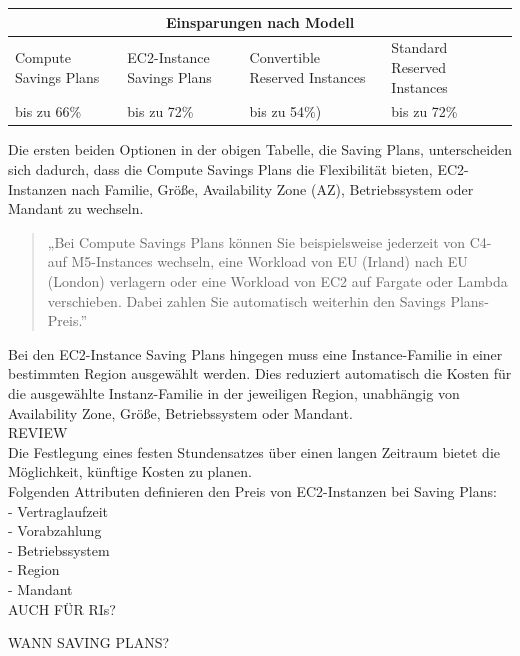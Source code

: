 \begin{table}[h!]
    \centering
    \begin{tabular}{ |p{3cm}||p{3cm}|p{3.6cm}|p{3.6cm}|  }
        \hline
        \multicolumn{4}{|c|}{Einsparungen nach Modell}                                                                    \\
        \hline
        Compute Savings Plans & EC2-Instance Savings Plans & Convertible Reserved Instances & Standard Reserved Instances \\
        \hline
        bis zu 66\%           & bis zu 72\%
                              & bis zu 54\%)               & bis zu 72\%
        \\
        \hline
    \end{tabular}
    {\cite{AMZ07,AMZ11}}
\end{table}
Die ersten beiden Optionen in der obigen Tabelle, die Saving Plans, unterscheiden sich dadurch, dass die Compute Savings Plans die Flexibilität bieten, EC2-Instanzen nach Familie, Größe, Availability Zone (AZ), Betriebssystem oder Mandant zu wechseln.
\begin{quote}
    „Bei Compute Savings Plans können Sie beispielsweise jederzeit von C4- auf M5-Instances wechseln, eine Workload von EU (Irland) nach EU (London) verlagern oder eine Workload von EC2 auf Fargate oder Lambda verschieben. Dabei zahlen Sie automatisch weiterhin den Savings Plans-Preis.”
    {\cite{AMZ11}}
\end{quote}

Bei den EC2-Instance Saving Plans hingegen muss eine Instance-Familie in einer bestimmten Region ausgewählt werden.  Dies reduziert automatisch die Kosten für die ausgewählte Instanz-Familie in der jeweiligen Region, unabhängig von Availability Zone, Größe, Betriebssystem oder Mandant.
\\
REVIEW{
\\
Die Festlegung eines festen Stundensatzes über einen langen Zeitraum bietet die Möglichkeit, künftige Kosten zu planen.}
\\
Folgenden Attributen definieren den Preis von EC2-Instanzen bei Saving Plans:
\\
- Vertraglaufzeit
\\
- Vorabzahlung
\\
- Betriebssystem
\\
- Region
\\
- Mandant
\\
AUCH FÜR RIs?

WANN SAVING PLANS? 

